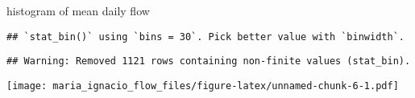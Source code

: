 \documentclass[]{article}
\newenvironment{Shaded}{\begin{snugshade}}{\end{snugshade}}
\newcommand{\KeywordTok}[1]{\textcolor[rgb]{0.13,0.29,0.53}{\textbf{{#1}}}}
\newcommand{\DataTypeTok}[1]{\textcolor[rgb]{0.13,0.29,0.53}{{#1}}}
\newcommand{\StringTok}[1]{\textcolor[rgb]{0.31,0.60,0.02}{{#1}}}
\newcommand{\NormalTok}[1]{{#1}}
\begin{document}
histogram of mean daily flow

\begin{Shaded}
\end{Shaded}

\begin{verbatim}
## `stat_bin()` using `bins = 30`. Pick better value with `binwidth`.
\end{verbatim}

\begin{verbatim}
## Warning: Removed 1121 rows containing non-finite values (stat_bin).
\end{verbatim}

\texttt{[image: maria\_ignacio\_flow\_files/figure-latex/unnamed-chunk-6-1.pdf]}
\end{document}
